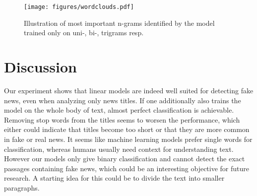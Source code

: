 \documentclass[10pt]{article}
\begin{document}
	\begin{figure}[h!]
		\centering
		\texttt{[image: figures/wordclouds.pdf]}
		\caption{Illustration of most important n-grams identified by the model trained only on uni-, bi-, trigrams resp.}
		\label{Fig 3}
	\end{figure}
	

	
	
	\section{Discussion}
	Our experiment shows that linear models are indeed well suited for detecting fake news, even when analyzing only news titles. If one additionally also trains the model on the whole body of text, almost perfect classification is achievable. Removing stop words from the titles seems to worsen the performance, which either could indicate that titles become too short or that they are more common in fake or real news. It seems like machine learning models prefer single words for classification, whereas humans usually need context for understanding text. However our models only give binary classification and cannot detect the exact passages containing fake news, which could be an interesting objective for future research. A starting idea for this could be to divide the text into smaller paragraphs. 
	
	
\end{document}
